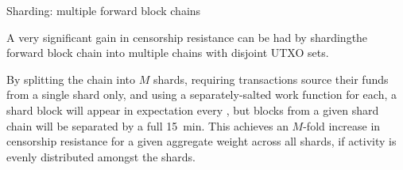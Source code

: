 \documentclass[10pt]{beamer}
\begin{document}
\begin{frame}{Sharding: multiple forward block chains}

  A very significant gain in censorship resistance can be had by
  sharding\footnotemark the forward block chain into multiple chains
  with disjoint UTXO sets.


  By splitting the chain into $M$ shards, requiring transactions
  source their funds from a single shard only, and using a
  separately-salted work function for each, a shard block will appear
  in expectation every , but blocks from
  a given shard chain will be separated by a full \SI{15}{\minute}.
  This achieves an $M$-fold increase in censorship resistance for a
  given aggregate weight across all shards, if activity is evenly
  distributed amongst the shards.

\end{frame}
\end{document}
